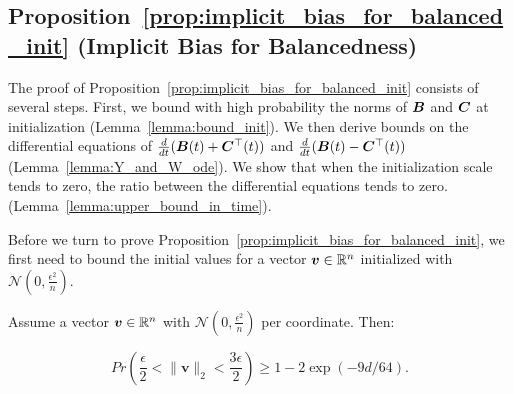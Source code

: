 \subsection{Proposition~\ref{prop:implicit_bias_for_balanced_init} (Implicit Bias for Balancedness)}
\label{sec:apdx:bias_to_symmetry} 

The proof of Proposition~\ref{prop:implicit_bias_for_balanced_init} consists of several steps. First, we bound with high probability the norms of ${\bm{B}}$ and ${\bm{C}}$ at initialization (Lemma~\ref{lemma:bound_init}). We then derive bounds on the differential equations of $\frac{d}{dt}({\bm{B}}(t)+{\bm{C}}^\top(t))$ and $\frac{d}{dt}({\bm{B}}(t)-{\bm{C}}^\top(t))$ (Lemma~\ref{lemma:Y_and_W_ode}). We show that when the initialization scale tends to zero, the ratio between the differential equations tends to zero. (Lemma~\ref{lemma:upper_bound_in_time}). %

Before we turn to prove Proposition~\ref{prop:implicit_bias_for_balanced_init}, we first need to bound the initial values for a vector ${\bm{v}}\in\mathbb{R}^n$ initialized with $\mathcal{N}(0,\frac{\epsilon^2}{n})$.

\begin{lemma}\label{lemma:bound_init}
    Assume a vector ${\bm{v}} \in \mathbb{R}^n$ with $\mathcal{N}(0,\frac{\epsilon^2}{n})$ per coordinate. Then:

\begin{equation}
    Pr\left(\frac{\epsilon}{2}< \|\mathbf{v}\|_2 < \frac{3\epsilon}{2} \right) \geq 1- 2 \exp(-9d/64 ).
\end{equation}
\end{lemma}

